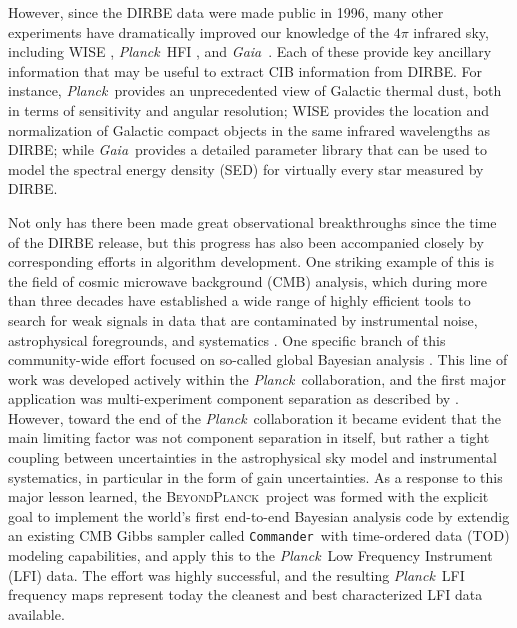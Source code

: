 \documentclass{aa}
\def\commander{\texttt{Commander}}
\def\Planck{\textit{Planck}}
\def\Gaia{\textit{Gaia}}
\newcommand{\bp}{\textsc{BeyondPlanck}}
\begin{document}
However, since the DIRBE data were made public in 1996, many other experiments have dramatically improved our knowledge of the $4\pi$ infrared sky, including WISE \citep{wright:2010}, \Planck\ HFI \citep{planck2016-l03}, and \Gaia\ \citep{gaia:2016}. Each of these provide key ancillary information that may be useful to extract CIB information from  DIRBE. For instance, \Planck\ provides an unprecedented view of Galactic thermal dust, both in terms of sensitivity and angular resolution; WISE provides the location and normalization of Galactic compact objects in the same infrared wavelengths as DIRBE; while \Gaia\ provides a detailed parameter library that can be used to model the spectral energy density (SED) for virtually every star measured by DIRBE.

Not only has there been made great observational breakthroughs since the time of the DIRBE release, but this progress has also been accompanied closely by corresponding efforts in algorithm development. One striking example of this is the field of cosmic microwave background (CMB) analysis, which during more than three decades have established a wide range of highly efficient tools to search for weak signals in data that are contaminated by instrumental noise, astrophysical foregrounds, and systematics \citep[e.g.,][]{bennett2012,pb2015,planck2016-l01}. One specific branch of this community-wide effort focused on so-called global Bayesian analysis \citep{jewell2004,wandelt2004}. This line of work was developed actively within the \Planck\ collaboration, and the first major application was multi-experiment component separation as described by \citet{planck2014-a12}. However, toward the end of the \Planck\ collaboration it became evident that the main limiting factor was not component separation in itself, but rather a tight coupling between uncertainties in the astrophysical sky model and instrumental systematics, in particular in the form of gain uncertainties. As a response to this major lesson learned, the \bp\ project \citep{bp01} was formed with the explicit goal to implement the world's first end-to-end Bayesian analysis code by extendig an existing CMB Gibbs sampler called \commander\ with time-ordered data (TOD) modeling capabilities, and apply this to the \Planck\ Low Frequency Instrument (LFI) data. The effort was highly successful, and the resulting \Planck\ LFI frequency maps represent today the cleanest and best characterized LFI data available.
\end{document}

